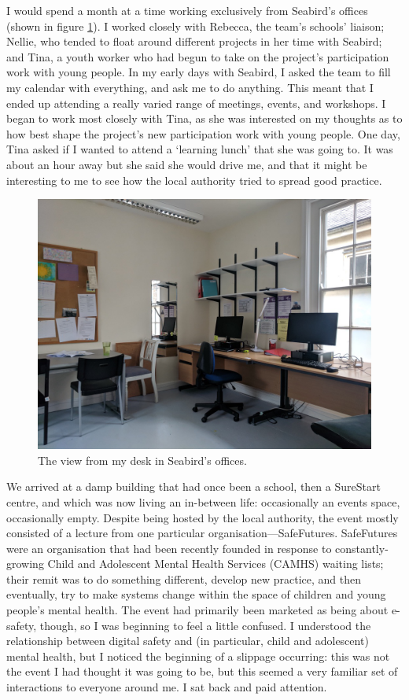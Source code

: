 I would spend a month at a time working exclusively from Seabird's offices (shown in figure \ref{fig:seabird}). I worked closely with Rebecca, the team’s schools’ liaison; Nellie, who tended to float around different projects in her time with Seabird; and Tina, a youth worker who had begun to take on the project’s participation work with young people. In my early days with Seabird, I asked the team to fill my calendar with everything, and ask me to do anything. This meant that I ended up attending a really varied range of meetings, events, and workshops. I began to work most closely with Tina, as she was interested on my thoughts as to how best shape the project’s new participation work with young people. One day, Tina asked if I wanted to attend a `learning lunch’ that she was going to. It was about an hour away but she said she would drive me, and that it might be interesting to me to see how the local authority tried to spread good practice.

\begin{figure}
    \centering
    \includegraphics[width=1\linewidth]{Images/3/seabird.png}
    \caption{The view from my desk in Seabird's offices.}
    \label{fig:seabird}
\end{figure}

We arrived at a damp building that had once been a school, then a SureStart centre, and which was now living an in-between life: occasionally an events space, occasionally empty. Despite being hosted by the local authority, the event mostly consisted of a lecture from one particular organisation—SafeFutures. SafeFutures were an organisation that had been recently founded in response to constantly-growing Child and Adolescent Mental Health Services (CAMHS) waiting lists; their remit was to do something different, develop new practice, and then eventually, try to make systems change within the space of children and young people's mental health. The event had primarily been marketed as being about e-safety, though, so I was beginning to feel a little confused. I understood the relationship between digital safety and (in particular, child and adolescent) mental health, but I noticed the beginning of a slippage occurring: this was not the event I had thought it was going to be, but this seemed a very familiar set of interactions to everyone around me. I sat back and paid attention. 

